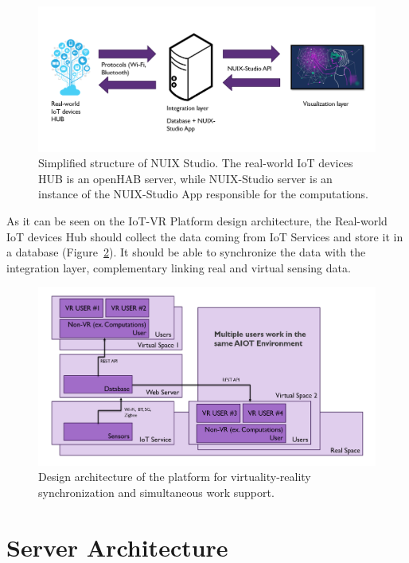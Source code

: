 \begin{figure}
  \centering
  \includegraphics[width=1.0\linewidth]{figures/BasicPlatformStructure.png}
  \caption{Simplified structure of NUIX Studio. The real-world IoT devices HUB is an openHAB server, while NUIX-Studio server is an instance of the NUIX-Studio App responsible for the computations.}
  \label{fig:BasicPlatformStructure-figure}
\end{figure}

As it can be seen on the IoT-VR Platform design architecture, the Real-world IoT devices Hub should collect the data coming from IoT Services and store it in a database (Figure~\ref{fig:StructureVersion2-figure}). It should be able to synchronize the data with the integration layer, complementary linking real and virtual sensing data.

\begin{figure}
  \centering
  \includegraphics[width=0.9\linewidth]{figures/StructureVersion2.png}
  \caption{Design architecture of the platform for virtuality-reality synchronization and simultaneous work support.}
  \label{fig:StructureVersion2-figure}
\end{figure}

\section{Server Architecture}

